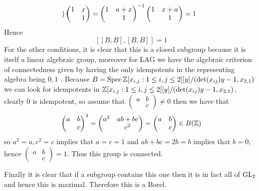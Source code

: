 \begin{example}
\[\begin{pmatrix}
        \end{pmatrix}\begin{pmatrix}
            1 & x \\ & 1
        \end{pmatrix} = \begin{pmatrix}
            1 & a + x \\ & 1
        \end{pmatrix}^{-1} \begin{pmatrix}
            1 & x+a \\ & 1
        \end{pmatrix} = 1\]
        Hence 
    \[[[B, B], [B, B]] = 1\]
    For the other conditions, it is clear that this is a closed subgroup because it is itself a linear algebraic group, moreover for LAG we have the algebraic criterion of connectedness given by having the only idempotents in the representing algebra being \(0, 1\) \cite[1.5]{getzIntroductionAutomorphicRepresentations2024}. Because \(B = \Spec \Z[x_{i,j}: 1\leq i,j\leq 2][y] / (\det(x_{ij})y - 1, x_{2,1})\) we can look for idempotents in \(\Z[x_{i,j}: 1\leq i,j\leq 2][y] / (\det(x_{ij})y - 1, x_{2,1})\), clearly \(0\) is idempotent, so assume that \(\begin{pmatrix}
        a & b \\ & c
    \end{pmatrix}\neq 0\) then we have that  
    \[\begin{pmatrix}
        a & b \\ & c
    \end{pmatrix}^2 = \begin{pmatrix}
        a^2 & ab + bc \\ & c^2
    \end{pmatrix} = \begin{pmatrix}
        a & b \\ & c
    \end{pmatrix}\in B(\Z)\]
    so \(a^2 = a, c^2 = c\) implies that \(a = c = 1\) and \(ab + bc = 2b = b\) implies that \(b=0\), hence \(\begin{pmatrix}
        a & b \\ & c
    \end{pmatrix} = 1\). Thus this group is connected. 
    
    Finally it is clear that if a subgroup contains this one then it is in fact all of \(\operatorname{GL}_2\) and hence this is maximal. Therefore this is a Borel.
    \end{example}
    
